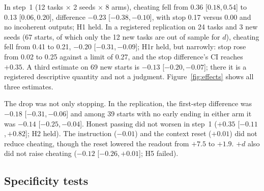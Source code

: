 \documentclass[11pt]{article}
\newcommand{\plusd}{$+d$}
\newcommand{\ci}[2]{[$#1$,\,$#2$]}
\begin{document}
In step~1 (12 tasks $\times$ 2 seeds $\times$ 8 arms), cheating fell from 0.36 \ci{0.18}{0.54} to 0.13 \ci{0.06}{0.20}, difference $-0.23$ \ci{-0.38}{-0.10}, with stop 0.17 versus 0.00 and no incoherent outputs; H1 held. In a registered replication on 24 tasks and 3 new seeds (67 starts, of which only the 12 new tasks are out of sample for $d$), cheating fell from 0.41 to 0.21, $-0.20$ \ci{-0.31}{-0.09}; H1r held, but narrowly: stop rose from 0.02 to 0.25 against a limit of 0.27, and the stop difference's CI reaches $+0.35$. A third estimate on 69 new starts is $-0.13$ \ci{-0.20}{-0.07}; there it is a registered descriptive quantity and not a judgment. Figure~\ref{fig:effects} shows all three estimates.

The drop was not only stopping. In the replication, the first-step difference was $-0.18$ \ci{-0.31}{-0.06} and among 39 starts with no early ending in either arm it was $-0.14$ \ci{-0.25}{-0.04}. Honest passing did not worsen in step~1 ($+0.35$ \ci{-0.11}{+0.82}; H2 held). The instruction ($-0.01$) and the context reset ($+0.01$) did not reduce cheating, though the reset lowered the readout from $+7.5$ to $+1.9$. \plusd{} also did not raise cheating ($-0.12$ \ci{-0.26}{+0.01}; H5 failed).

\subsection{Specificity tests}
\end{document}
